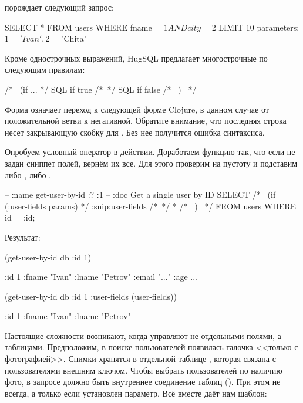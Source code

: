 \noindent
порождает следующий запрос:

\begin{english}
  \begin{sql}
SELECT * FROM users
WHERE fname = $1
  AND city = $2
LIMIT 10
parameters: $1 = 'Ivan', $2 = 'Chita'
  \end{sql}
\end{english}

Кроме однострочных выражений, HugSQL предлагает многострочные по следующим правилам:

\begin{english}
  \begin{sql}
/*~ (if ... */
SQL if true
/*~*/
SQL if false
/*~ ) ~*/
  \end{sql}
\end{english}

Форма \code{/*{}\~{}*/} означает переход к следующей форме Clojure, в данном случае от положительной ветви  к негативной. Обратите внимание, что последняя строка несет закрывающую скобку для . Без нее получится ошибка синтаксиса.

Опробуем условный оператор в действии. Доработаем функцию  так, что если не задан сниппет полей, вернём их все. Для этого проверим  на пустоту и подставим либо , либо \code{*}.

\begin{english}
  \begin{sql}
-- :name get-user-by-id :? :1
-- :doc Get a single user by ID
SELECT
/*~ (if (:user-fields params) */
:snip:user-fields
/*~*/
*
/*~ ) ~*/
FROM users
WHERE id = :id;
  \end{sql}
\end{english}

Результат:

\begin{english}
  \begin{clojure}
(get-user-by-id db {:id 1})

{:id 1
 :fname "Ivan"
 :lname "Petrov"
 :email "..."
 :age ...}

(get-user-by-id db {:id 1 :user-fields (user-fields)})

{:id 1
 :fname "Ivan"
 :lname "Petrov"}
  \end{clojure}
\end{english}

Настоящие сложности возникают, когда управляют не отдельными полями, а таблицами. Предположим, в поиске пользователей появилась галочка <<только с фотографией>>. Снимки хранятся в отдельной таблице , которая связана с пользователями внешним ключом. Чтобы выбрать пользователей по наличию фото, в запросе должно быть внутреннее соединение таблиц (). При этом не всегда, а только если установлен параметр. Всё вместе даёт нам шаблон:

